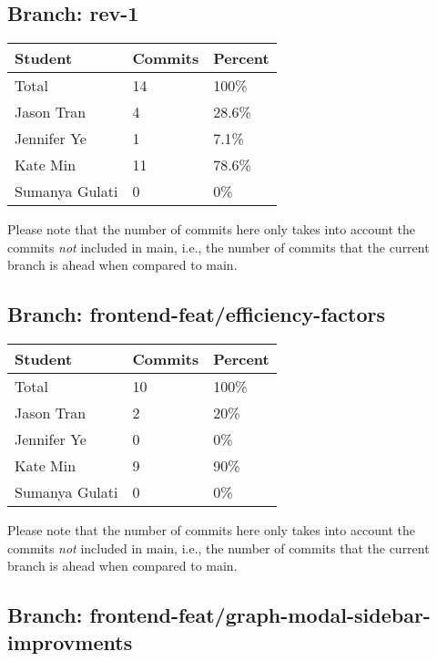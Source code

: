 \documentclass{article}
\begin{document}
\subsection{Branch: rev-1}

\begin{table}[H]
\centering
\begin{tabular}{lll}
\toprule
\textbf{Student} & \textbf{Commits} & \textbf{Percent}\\
\midrule
Total & 14 & 100\% \\
Jason Tran & 4 & 28.6\% \\
Jennifer Ye & 1 & 7.1\% \\
Kate Min & 11 & 78.6\% \\
Sumanya Gulati & 0 & 0\% \\
\bottomrule
\end{tabular}
\end{table}

Please note that the number of commits here only takes into account the commits \emph{not}
included in main, i.e., the number of commits that the current branch is ahead when compared 
to main.

\subsection{Branch: frontend-feat/efficiency-factors}

\begin{table}[H]
\centering
\begin{tabular}{lll}
\toprule
\textbf{Student} & \textbf{Commits} & \textbf{Percent}\\
\midrule
Total & 10 & 100\% \\
Jason Tran & 2 & 20\% \\
Jennifer Ye & 0 & 0\% \\
Kate Min & 9 & 90\% \\
Sumanya Gulati & 0 & 0\% \\
\bottomrule
\end{tabular}
\end{table}

Please note that the number of commits here only takes into account the commits \emph{not}
included in main, i.e., the number of commits that the current branch is ahead when compared 
to main.

\subsection{Branch: frontend-feat/graph-modal-sidebar-improvments}
\end{document}
